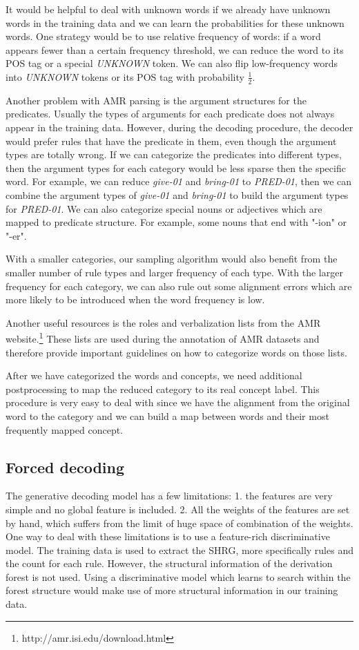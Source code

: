 It would be helpful to deal with unknown words if we already have unknown words in the training data and we can learn the probabilities for these unknown words.
One strategy would be to use relative frequency of words: if a word appears fewer than a certain frequency threshold, we can reduce the word to its POS tag or a special \textit{UNKNOWN} token. We can also flip low-frequency words into \textit{UNKNOWN} tokens or its POS tag with 
probability $\frac{1}{2}$.


Another problem with AMR parsing is the argument structures for the predicates. Usually the types of arguments for each predicate does not always appear in the training data.
However, during the decoding procedure, the decoder would prefer rules that have the predicate in them, even though the argument types are totally wrong.
If we can categorize the predicates into different types, then the argument types for each category would be less sparse then the specific word.
For example, we can reduce \textit{give-01} and \textit{bring-01} to \textit{PRED-01}, then we can combine the argument types of \textit{give-01} and \textit{bring-01} 
to build the argument types for \textit{PRED-01}. We can also categorize special nouns or adjectives which are mapped to predicate structure. For example, some nouns that end with "-ion" or "-er".


With a smaller categories, our sampling algorithm would also benefit from the smaller number of rule types and larger frequency of each type. With the larger frequency for each category, we can also rule out some alignment errors which are 
more likely to be introduced when the word frequency is low.


Another useful resources is the roles and verbalization lists from the AMR website.\footnote{http://amr.isi.edu/download.html} These lists are used during
the annotation of AMR datasets and therefore provide important guidelines on how to categorize words on those lists.


After we have categorized the words and concepts, we need additional postprocessing to map the reduced category to its real concept label. This
procedure is very easy to deal with since we have the alignment from the original word to the category and we can build a map between words and their most frequently mapped concept.
\subsection{Forced decoding}
The generative decoding model has a few limitations: 1. the features are very simple and no global feature is included. 2. All the weights of the features are
set by hand, which suffers from the limit of huge space of combination of the weights.
One way to deal with these limitations is to use a feature-rich discriminative model. The training data is used to extract the SHRG, more specifically
rules and the count for each rule. However, the structural information of the derivation forest is not used. Using a discriminative model which
learns to search within the forest structure would make use of more structural information in our training data.


